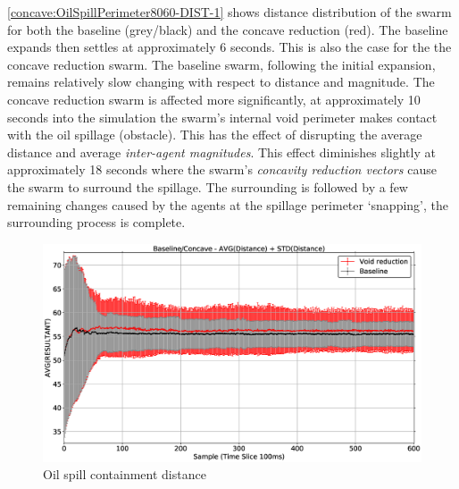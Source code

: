 \autoref{concave:OilSpillPerimeter8060-DIST-1} shows distance distribution of the swarm for both the baseline (grey/black) and the concave reduction (red). The baseline expands then settles at approximately 6 seconds. This is also the case for the the concave reduction swarm. The baseline swarm, following the initial expansion, remains relatively slow changing with respect to distance and magnitude. The concave reduction swarm is affected more significantly, at approximately 10 seconds into the simulation the swarm's internal void perimeter makes contact with the oil spillage (obstacle). This has the effect of disrupting the average distance and average \textit{inter-agent magnitudes}. This effect diminishes slightly at approximately 18 seconds where the swarm's \textit{concavity reduction vectors} cause the swarm to surround the spillage. The surrounding is followed by a few remaining changes caused by the agents at the spillage perimeter `snapping', the surrounding process is complete.
\begin{figure}[H]
\begin{center}
\includegraphics[width=14cm]{CHAPTER-7/figures/OilSpillPerimeter8060-DIST-1}
\end{center}
\caption{Oil spill containment distance\label{concave:OilSpillPerimeter8060-DIST-1}}
\end{figure}


